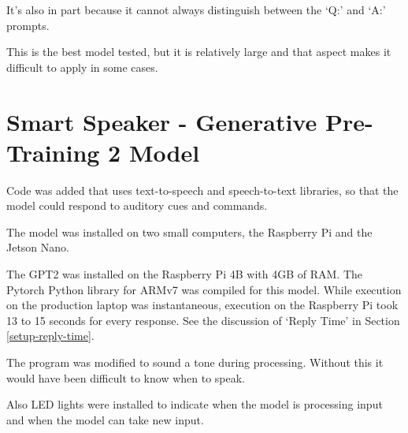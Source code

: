 It's also in part because it cannot always distinguish between the `Q:' and `A:' prompts.

This is the best model tested, but it is relatively large and that aspect makes it difficult to apply in some cases.

\section{Smart Speaker - Generative Pre-Training 2 Model}

\label{install-gpt2-smart}
Code was added that uses text-to-speech and speech-to-text libraries, so that the model could respond to auditory cues and commands.

The model was installed on two small computers, the Raspberry Pi and the Jetson Nano.%

The GPT2 was installed on the Raspberry Pi 4B with 4GB of RAM. The Pytorch Python library for ARMv7 was compiled for this model. 
While execution on the production laptop was instantaneous, execution on the Raspberry Pi took 13 to 15 seconds for every response. See the discussion of `Reply Time' in Section \ref{setup-reply-time}.

The program was modified to sound a tone during processing. 
Without this it would have been difficult to know when to speak.%

Also LED lights were installed to indicate when the model is processing input and when the model can take new input. %
